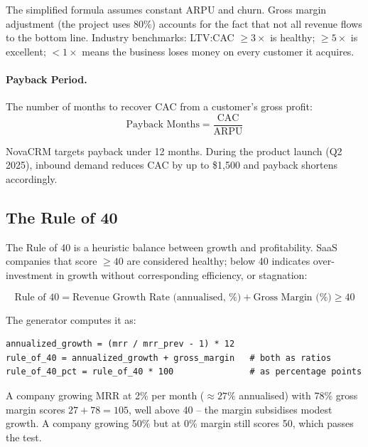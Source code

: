 The simplified formula assumes constant ARPU and churn. Gross margin adjustment (the project uses 80\%) accounts for the fact that not all revenue flows to the bottom line. Industry benchmarks: LTV:CAC $\geq 3\times$ is healthy; $\geq 5\times$ is excellent; $< 1\times$ means the business loses money on every customer it acquires.

\paragraph{Payback Period.}
The number of months to recover CAC from a customer's gross profit:
\begin{equation}
  \text{Payback Months} = \frac{\text{CAC}}{\text{ARPU}}
\end{equation}

NovaCRM targets payback under 12 months. During the product launch (Q2 2025), inbound demand reduces CAC by up to \$1,500 and payback shortens accordingly.

\subsection{The Rule of 40}

The Rule of 40 is a heuristic balance between growth and profitability. SaaS companies that score $\geq 40$ are considered healthy; below 40 indicates over-investment in growth without corresponding efficiency, or stagnation:

\begin{equation}
  \text{Rule of 40} = \text{Revenue Growth Rate (annualised, \%)} + \text{Gross Margin (\%)} \geq 40
\end{equation}

The generator computes it as:
\begin{lstlisting}[style=python, caption={Rule of 40 computation in 01\_generate\_saas\_data.py.}]
annualized_growth = (mrr / mrr_prev - 1) * 12
rule_of_40 = annualized_growth + gross_margin   # both as ratios
rule_of_40_pct = rule_of_40 * 100               # as percentage points
\end{lstlisting}

A company growing MRR at 2\% per month (\(\approx 27\%\) annualised) with 78\% gross margin scores \(27 + 78 = 105\), well above 40 -- the margin subsidises modest growth. A company growing 50\% but at 0\% margin still scores 50, which passes the test.

